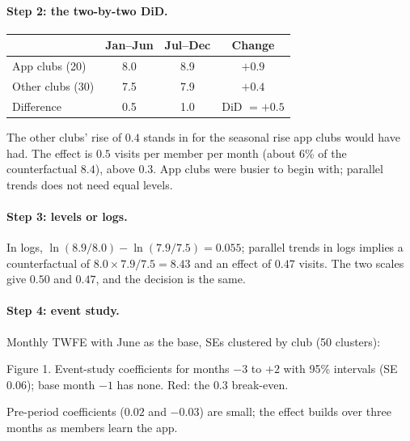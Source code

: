 \documentclass[11pt]{article}
\begin{document}
\paragraph{Step 2: the two-by-two DiD.}
\begin{center}
\begin{tabular}{lccc}
\toprule
 & Jan--Jun & Jul--Dec & Change \\
\midrule
App clubs (20) & 8.0 & 8.9 & $+0.9$ \\
Other clubs (30) & 7.5 & 7.9 & $+0.4$ \\
\midrule
Difference & 0.5 & 1.0 & DiD $= +0.5$ \\
\bottomrule
\end{tabular}
\end{center}
The other clubs' rise of $0.4$ stands in for the seasonal rise app clubs would have had. The effect is $0.5$ visits per member per month (about 6\% of
the counterfactual $8.4$), above $0.3$. App clubs were busier to begin with; parallel trends does not need equal levels.

\paragraph{Step 3: levels or logs.} In logs, $\ln(8.9/8.0) - \ln(7.9/7.5) = 0.055$; parallel trends in logs implies a counterfactual of
$8.0 \times 7.9/7.5 = 8.43$ and an effect of $0.47$ visits. The two scales give $0.50$ and $0.47$, and the decision is the same.

\paragraph{Step 4: event study.} Monthly TWFE with June as the base, SEs clustered by club (50 clusters):
\begin{center}

\small Figure 1. Event-study coefficients for months $-3$ to $+2$ with 95\% intervals (SE $0.06$); base month $-1$ has none. Red: the $0.3$ break-even.
\end{center}
Pre-period coefficients ($0.02$ and $-0.03$) are small; the effect builds over three months as members learn the app.
\end{document}
